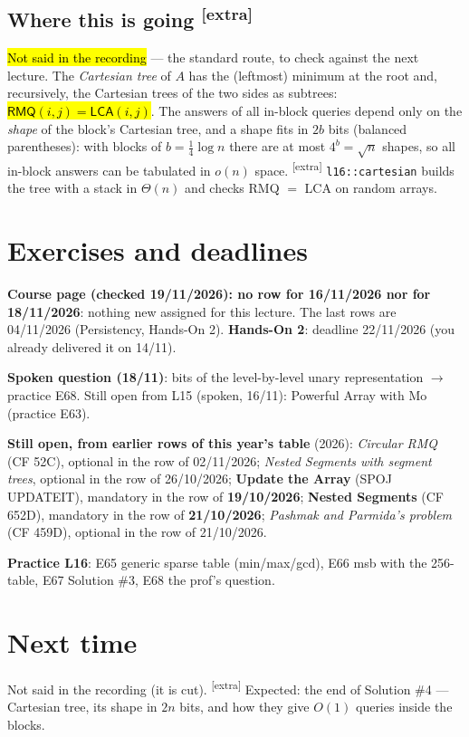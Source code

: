 \documentclass[11pt,a4paper]{article}
\theoremstyle{definition}\newtheorem*{definition}{Definition}
\newcommand{\hlp}[1]{{\sethlcolor{hlP}\hl{#1}}}
\newcommand{\hlb}[1]{{\sethlcolor{hlB}\hl{#1}}}
\newcommand{\extra}{\textsuperscript{\textcolor{warn}{[extra]}}}
\begin{document}
\subsection{Where this is going \extra}
\hlp{Not said in the recording} --- the standard route, to check against the next lecture. The \emph{Cartesian tree} of $A$ has the (leftmost) minimum at the root and, recursively, the Cartesian trees of the two sides as subtrees:
\hlb{$\textsf{RMQ}(i,j)=\textsf{LCA}(i,j)$}. The answers of all in-block queries depend only on the \emph{shape} of the block's Cartesian tree, and a shape fits in $2b$ bits (balanced parentheses):
with blocks of $b=\frac14\log n$ there are at most $4^b=\sqrt n$ shapes, so all in-block answers can be tabulated in $o(n)$ space. \extra{} \texttt{l16::cartesian} builds the tree with a stack in $\Theta(n)$ and checks RMQ $=$ LCA on random arrays.

\section{Exercises and deadlines}\label{sec:ex}
\begin{keybox}
\textbf{Course page (checked 19/11/2026): no row for 16/11/2026 nor for 18/11/2026}: nothing new assigned for this lecture. The last rows are 04/11/2026 (Persistency, Hands-On 2).
\textbf{Hands-On 2}: deadline 22/11/2026 (you already delivered it on 14/11).

\smallskip
\textbf{Spoken question (18/11)}: bits of the level-by-level unary representation $\to$ practice E68. Still open from L15 (spoken, 16/11): Powerful Array with Mo (practice E63).

\smallskip
\textbf{Still open, from earlier rows of this year's table} (2026): \emph{Circular RMQ} (CF 52C), optional in the row of 02/11/2026; \emph{Nested Segments with segment trees}, optional in the row of 26/10/2026;
\textbf{Update the Array} (SPOJ UPDATEIT), mandatory in the row of \textbf{19/10/2026}; \textbf{Nested Segments} (CF 652D), mandatory in the row of \textbf{21/10/2026}; \emph{Pashmak and Parmida's problem} (CF 459D), optional in the row of 21/10/2026.

\smallskip
\textbf{Practice L16}: E65 generic sparse table (min/max/gcd), E66 msb with the 256-table, E67 Solution \#3, E68 the prof's question.
\end{keybox}

\section{Next time}
Not said in the recording (it is cut). \extra{} Expected: the end of Solution \#4 --- Cartesian tree, its shape in $2n$ bits, and how they give $O(1)$ queries inside the blocks.
\end{document}
